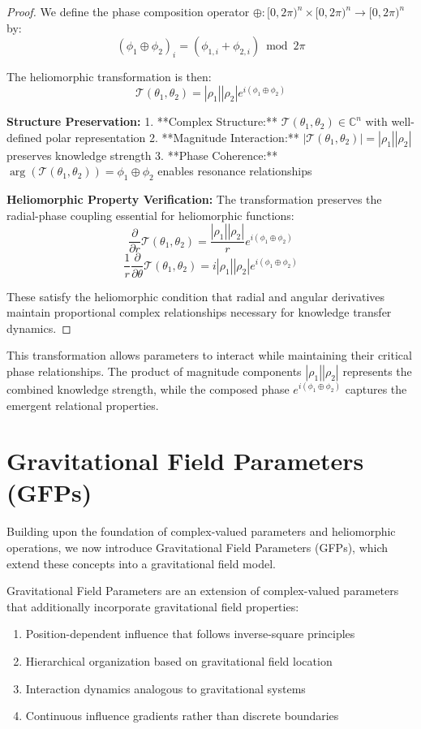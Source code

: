 \begin{proof}
We define the phase composition operator $\oplus: [0,2\pi)^n \times [0,2\pi)^n \rightarrow [0,2\pi)^n$ by:
$$(\phi_1 \oplus \phi_2)_i = (\phi_{1,i} + \phi_{2,i}) \bmod 2\pi$$

The heliomorphic transformation is then:
$$\mathcal{T}(\theta_1, \theta_2) = |\rho_1||\rho_2|e^{i(\phi_1 \oplus \phi_2)}$$

\textbf{Structure Preservation:} 
1. **Complex Structure:** $\mathcal{T}(\theta_1, \theta_2) \in \mathbb{C}^n$ with well-defined polar representation
2. **Magnitude Interaction:** $|\mathcal{T}(\theta_1, \theta_2)| = |\rho_1||\rho_2|$ preserves knowledge strength
3. **Phase Coherence:** $\arg(\mathcal{T}(\theta_1, \theta_2)) = \phi_1 \oplus \phi_2$ enables resonance relationships

\textbf{Heliomorphic Property Verification:}
The transformation preserves the radial-phase coupling essential for heliomorphic functions:
$$\frac{\partial}{\partial r} \mathcal{T}(\theta_1, \theta_2) = \frac{|\rho_1||\rho_2|}{r} e^{i(\phi_1 \oplus \phi_2)}$$
$$\frac{1}{r}\frac{\partial}{\partial \theta} \mathcal{T}(\theta_1, \theta_2) = i|\rho_1||\rho_2| e^{i(\phi_1 \oplus \phi_2)}$$

These satisfy the heliomorphic condition that radial and angular derivatives maintain proportional complex relationships necessary for knowledge transfer dynamics.
\end{proof}

This transformation allows parameters to interact while maintaining their critical phase relationships. The product of magnitude components $|\rho_1||\rho_2|$ represents the combined knowledge strength, while the composed phase $e^{i(\phi_1 \oplus \phi_2)}$ captures the emergent relational properties.

\section{Gravitational Field Parameters (GFPs)}

Building upon the foundation of complex-valued parameters and heliomorphic operations, we now introduce Gravitational Field Parameters (GFPs), which extend these concepts into a gravitational field model.

\begin{definition}
Gravitational Field Parameters are an extension of complex-valued parameters that additionally incorporate gravitational field properties:
\begin{enumerate}
    \item Position-dependent influence that follows inverse-square principles
    \item Hierarchical organization based on gravitational field location
    \item Interaction dynamics analogous to gravitational systems
    \item Continuous influence gradients rather than discrete boundaries
\end{enumerate}
\end{definition}

